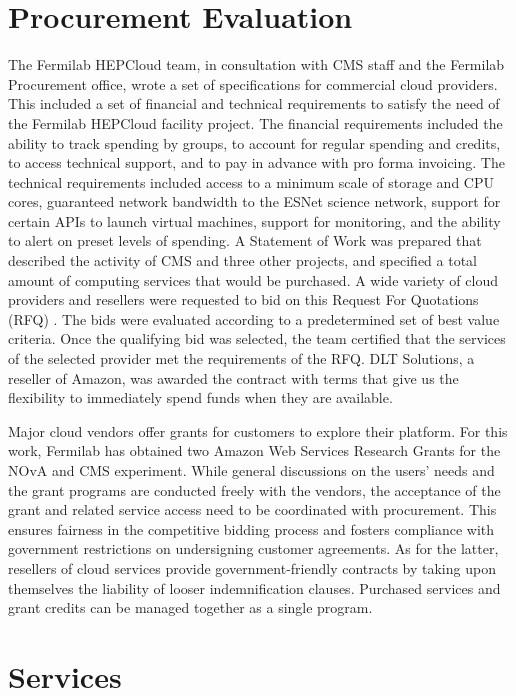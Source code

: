 \documentclass[twocolumn]{svjour3}          %
\begin{document}
\section{Procurement Evaluation}
The Fermilab HEPCloud team, in consultation with CMS staff and the Fermilab Procurement office, wrote a set of specifications for commercial cloud providers. This included a set of financial and technical requirements to satisfy the need of the Fermilab HEPCloud facility project. The financial requirements included the ability to track spending by groups, to account for regular spending and credits, to access technical support, and to pay in advance with pro forma invoicing. The technical requirements included access to a minimum scale of storage and CPU cores, guaranteed network bandwidth to the ESNet science network, support for certain APIs to launch virtual machines, support for monitoring, and the ability to alert on preset levels of spending.  A Statement of Work was prepared that described the activity of CMS and three other projects, and specified a total amount of computing services that would be purchased.  A wide variety of cloud providers and resellers were requested to bid on this Request For Quotations (RFQ) \cite{FNAL_RFP}. 
The bids were evaluated according to a predetermined set of best value criteria. Once the qualifying bid was selected, the team certified that the services of the selected provider met the requirements of the RFQ. DLT Solutions, a reseller of Amazon, was awarded the contract with terms that give us the flexibility to immediately spend funds when they are available.

Major cloud vendors offer grants for customers to explore their platform. For this work, Fermilab has obtained two Amazon Web Services Research Grants for the NOvA and CMS experiment.
While general discussions on the users' needs and the grant programs are conducted freely with the vendors, the acceptance of the grant and related service access need to be coordinated with procurement.
This ensures fairness in the competitive bidding process and fosters compliance with government restrictions on undersigning customer agreements.
As for the latter, resellers of cloud services provide government-friendly contracts by taking upon themselves the liability of looser indemnification clauses.
Purchased services and grant credits can be managed together as a single program.

\section{Services}
\end{document}
